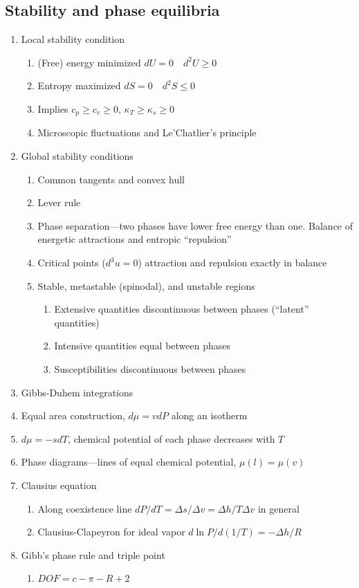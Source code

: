 \documentclass[11pt]{article}
\begin{document}
\subsection{Stability and phase equilibria}
\label{sec:org9c0c172}
\begin{enumerate}
\item Local stability condition
\begin{enumerate}
\item (Free) energy minimized \(dU=0\quad d^2U \geq 0\)
\item Entropy maximized \(dS = 0\quad d^2S \leq 0\)
\item Implies \(c_p \geq c_v \geq 0\), \(\kappa_T \geq \kappa_s \geq 0\)
\item Microscopic fluctuations and Le'Chatlier's principle
\end{enumerate}

\item Global stability conditions
\begin{enumerate}
\item Common tangents and convex hull
\item Lever rule
\item Phase separation---two phases have lower free energy
than one.  Balance of energetic attractions and entropic ``repulsion''
\item Critical points (\(d^3u = 0\)) attraction and repulsion
exactly in balance
\item Stable, metastable (spinodal), and unstable regions
\begin{enumerate}
\item Extensive quantities discontinuous between phases (``latent'' quantities)
\item Intensive quantities equal between phases
\item Susceptibilities discontinuous between phases
\end{enumerate}
\end{enumerate}

\item Gibbs-Duhem integrations
\item Equal area construction, \(d\mu = vdP\) along an isotherm
\item \(d\mu = - s dT\), chemical potential of each phase decreases with \(T\)
\item Phase diagrams---lines of equal chemical potential, \(\mu(l)=\mu(v)\)
\item Clausius equation
\begin{enumerate}
\item Along coexistence line \(dP/dT = \Delta s/\Delta v = \Delta
      h/T\Delta v\) in general
\item Clausius-Clapeyron for ideal vapor \(d\ln P/d(1/T) = -\Delta h/R\)
\end{enumerate}

\item Gibb's phase rule and triple point
\begin{enumerate}
\item \(DOF = c -\pi - R + 2\)
\end{enumerate}
\end{enumerate}
\end{document}
